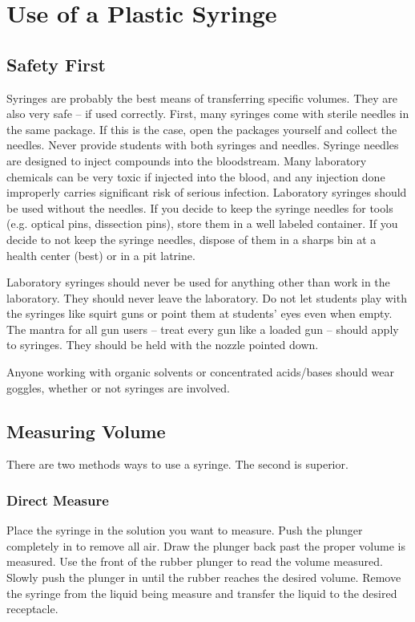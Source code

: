 \chapter{Use of a Plastic Syringe}

\section{Safety First}

Syringes are probably the best means of transferring specific volumes. They are also very safe -- if used correctly. First, many syringes come with sterile needles in the same package. If this is the case, open the packages yourself and collect the needles. Never provide students with both syringes and needles. Syringe needles are designed to inject compounds into the bloodstream. Many laboratory chemicals can be very toxic if injected into the blood, and any injection done improperly carries significant risk of serious infection. Laboratory syringes should be used without the needles. If you decide to keep the syringe needles for tools (e.g. optical pins, dissection pins), store them in a well labeled container. If you decide to not keep the syringe needles, dispose of them in a sharps bin at a health center (best) or in a pit latrine.

Laboratory syringes should never be used for anything other than work in the laboratory. They should never leave the laboratory. Do not let students play with the syringes like squirt guns or point them at students’ eyes even when empty. The mantra for all gun users -- treat every gun like a loaded gun -- should apply to syringes. They should be held with the nozzle pointed down.

Anyone working with organic solvents or concentrated acids/bases should wear goggles, whether or not syringes are involved.

\section{Measuring Volume}

There are two methods ways to use a syringe. The second is superior.

\subsection{Direct Measure}
Place the syringe in the solution you want to measure. Push the plunger completely in to remove all air. Draw the plunger back past the proper volume is measured. Use the front of the rubber plunger to read the volume measured. Slowly push the plunger in until the rubber reaches the desired volume. Remove the syringe from the liquid being measure and transfer the liquid to the desired receptacle.

